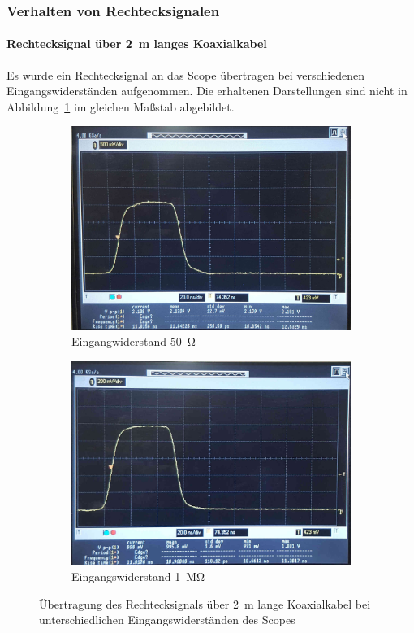 \documentclass[a4paper,twoside,final]{article}
\begin{document}
\subsubsection{Verhalten von Rechtecksignalen}
\paragraph{Rechtecksignal über \SI{2}{\metre} langes Koaxialkabel}
Es wurde ein Rechtecksignal an das Scope übertragen bei verschiedenen Eingangswiderständen aufgenommen. Die erhaltenen Darstellungen sind nicht in Abbildung~\ref{fig:Rechtecksignal_Koaxialkabel} im gleichen Maßstab abgebildet.
\begin{figure}[h]
  \centering
  \begin{subfigure}{0.45\textwidth}
    \includegraphics[width=\textwidth]{Bilder/Bild1.jpg}
    \caption{Eingangwiderstand \SI{50}{\ohm}}
  \end{subfigure}\hspace{1cm}
  \begin{subfigure}{0.45\textwidth}
    \includegraphics[width=\textwidth]{Bilder/Bild2.jpg}
    \caption{Eingangswiderstand \SI{1}{\mega\ohm}}
  \end{subfigure}
  \caption{Übertragung des Rechtecksignals über \SI{2}{\metre} lange Koaxialkabel bei unterschiedlichen Eingangswiderständen des Scopes}
  \label{fig:Rechtecksignal_Koaxialkabel}
\end{figure}\\
\end{document}
